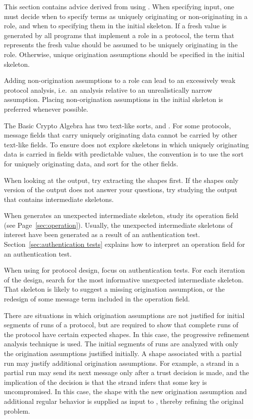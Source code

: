 \documentclass[12pt]{article}
\begin{document}
This section contains advice derived from using {\cpsa}.  When
specifying {\cpsa} input, one must decide when to specify terms as
uniquely originating or non-originating in a role, and when to
specifying them in the initial skeleton.  If a fresh value is
generated by all programs that implement a role in a protocol, the
term that represents the fresh value should be assumed to be uniquely
originating in the role.  Otherwise, unique origination assumptions
should be specified in the initial skeleton.

Adding non-origination assumptions to a role can lead to an
excessively weak protocol analysis, i.e.\ an analysis relative to an
unrealistically narrow assumption.  Placing non-origination
assumptions in the initial skeleton is preferred whenever possible.

The Basic Crypto Algebra has two text-like sorts,  and
.  For some protocols, message fields that carry uniquely
originating data cannot be carried by other text-like fields.  To
ensure {\cpsa} does not explore skeletons in which uniquely
originating data is carried in fields with predictable values, the
convention is to use the sort  for uniquely originating
data, and sort  for the other fields.

When looking at the output, try extracting the shapes first.  If the
shapes only version of the output does not answer your questions, try
studying the output that contains intermediate skeletons.

When {\cpsa} generates an unexpected intermediate skeleton, study its
operation field (see Page~\ref{sec:operation}).  Usually, the
unexpected intermediate skeletons of interest have been generated as a
result of an authentication test.  Section~\ref{sec:authentication
  tests} explains how to interpret an operation field for an
authentication test.

When using {\cpsa} for protocol design, focus on authentication tests.
For each iteration of the design, search for the most informative
unexpected intermediate skeleton.  That skeleton is likely to suggest
a  missing origination assumption, or the redesign of some message
term included in the operation field.

There are situations in which origination assumptions are not
justified for initial segments of runs of a protocol, but are required
to show that complete runs of the protocol have certain expected
shapes.  In this case, the progressive refinement analysis technique
is used.  The initial segments of runs are analyzed with only the
origination assumptions justified initially.  A shape associated with
a partial run may justify additional origination assumptions.  For
example, a strand in a partial run may send its next message only
after a trust decision is made, and the implication of the decision is
that the strand infers that some key is uncompromised.  In this
case, the shape with the new origination assumption and additional
regular behavior is supplied as input to {\cpsa}, thereby refining the
original problem.
\end{document}
